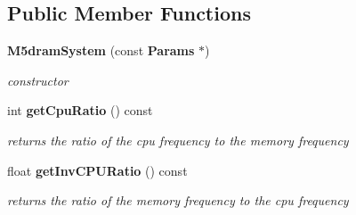 \subsection*{Public Member Functions}
\begin{CompactItemize}
\item 
{\bf M5dramSystem} (const {\bf Params} $\ast$)\label{class_m5dram_system_84fc057ba92f2b4259bb6e48dfda6e67}

\begin{CompactList}\small\item\em constructor \item\end{CompactList}\item 
int {\bf getCpuRatio} () const \label{class_m5dram_system_eaafbc3dd2f506366fb2846290519329}

\begin{CompactList}\small\item\em returns the ratio of the cpu frequency to the memory frequency \item\end{CompactList}\item 
float {\bf getInvCPURatio} () const \label{class_m5dram_system_6a265c00d8b099faff4ec0b65b56a69b}

\begin{CompactList}\small\item\em returns the ratio of the memory frequency to the cpu frequency \item\end{CompactList}\end{CompactItemize}
